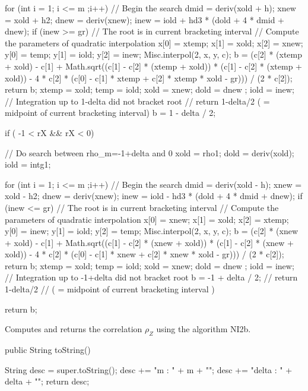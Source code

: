 \begin{code}
\begin{hide}
{{         for (int i = 1; i <= m ;i++) { // Begin the search
            dmid = deriv(xold + h);
            xnew = xold + h2;
            dnew = deriv(xnew);
            inew = iold + hd3 * (dold + 4 * dmid + dnew);
            if (inew >= gr) { // The root is in current bracketing interval
               // Compute the parameters of quadratic interpolation
               x[0] = xtemp;
               x[1] = xold;
               x[2] = xnew;
               y[0] = temp;
               y[1] = iold;
               y[2] = inew;
               Misc.interpol(2, x, y, c);
               b = (c[2] * (xtemp + xold) - c[1] + Math.sqrt((c[1]
                    - c[2] * (xtemp + xold)) * (c[1] - c[2]
                    * (xtemp + xold)) - 4 * c[2] * (c[0] - c[1]
                    * xtemp + c[2] * xtemp * xold - gr))) / (2 * c[2]);
               return b;
            }
            xtemp = xold;
            temp = iold;
            xold = xnew;
            dold = dnew ;
            iold = inew;
         }
         // Integration up to 1-delta did not bracket root
         // return 1-delta/2 ( = midpoint of current bracketing interval)
         b = 1 - delta / 2;
      }

      if ( -1 < rX && rX < 0) { // Do search between rho_m=-1+delta and 0
         xold = rho1;
         dold = deriv(xold);
         iold = intg1;

         for (int i = 1; i <= m ;i++) { // Begin the search
            dmid = deriv(xold - h);
            xnew = xold - h2;
            dnew = deriv(xnew);
            inew = iold - hd3 * (dold + 4 * dmid + dnew);
            if (inew <= gr) { // The root is in current bracketing interval
               // Compute the parameters of quadratic interpolation
               x[0] = xnew;
               x[1] = xold;
               x[2] = xtemp;
               y[0] = inew;
               y[1] = iold;
               y[2] = temp;
               Misc.interpol(2, x, y, c);
               b = (c[2] * (xnew + xold) - c[1] + Math.sqrt((c[1]
                    - c[2] * (xnew + xold)) * (c[1] - c[2]
                    * (xnew + xold)) - 4 * c[2] * (c[0] - c[1]
                    * xnew + c[2] * xnew * xold - gr))) / (2 * c[2]);
               return b;
            }
            xtemp = xold;
            temp = iold;
            xold = xnew;
            dold = dnew ;
            iold = inew;
         }
         // Integration up to -1+delta did not bracket root
         b = -1 + delta / 2; // return 1-delta/2
         // ( = midpoint of current bracketing interval )
      }
      return b;
   }\end{hide}
\end{code}
\begin{tabb} Computes and returns the correlation $\rho_Z$ using the algorithm NI2b.
\end{tabb}
\begin{code}

   public String toString()\begin{hide}
   {
      String desc = super.toString();
      desc += "m :  " + m + "\n";
      desc += "delta : " + delta + "\n";
      return desc;
   }\end{hide}
\end{code}

\begin{code}\begin{hide}
}\end{hide}
\end{code}
